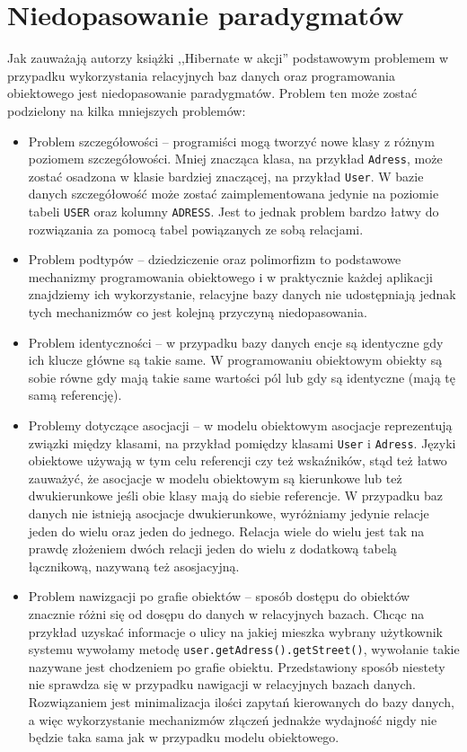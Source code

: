 \documentclass[12pt]{report}
\begin{document}
\section{Niedopasowanie paradygmatów}

Jak zauważają autorzy książki ,,Hibernate w akcji'' \cite{hibernate} podstawowym problemem w przypadku wykorzystania relacyjnych baz danych oraz programowania 
obiektowego jest niedopasowanie paradygmatów. Problem ten może zostać podzielony na kilka mniejszych problemów:

\begin{itemize}
\item Problem szczegółowości -- programiści mogą tworzyć nowe klasy z różnym poziomem szczegółowości. Mniej znacząca klasa, na przykład {\tt Adress}, może zostać
osadzona w klasie bardziej znaczącej, na przykład {\tt User}. W bazie danych szczegółowość może zostać zaimplementowana jedynie na po\-ziomie tabeli
{\tt USER} oraz kolumny {\tt ADRESS}. Jest to jednak problem bardzo łatwy do rozwiązania za pomocą tabel powiązanych ze sobą relacjami.
\item Problem podtypów -- dziedziczenie oraz polimorfizm to podstawowe mechanizmy programowania obiektowego i w praktycznie każdej aplikacji znajdziemy ich 
wykorzystanie, relacyjne bazy danych nie udostępniają jednak tych mechanizmów co jest kolejną przyczyną niedopasowania.
\item Problem identyczności -- w przypadku bazy danych encje są identyczne gdy ich klucze główne są takie same. W programowaniu obiektowym obiekty są sobie równe
gdy mają takie same wartości pól lub gdy są identyczne (mają tę samą referencję).
\item Problemy dotyczące asocjacji -- w modelu obiektowym asocjacje reprezentują związki między klasami, na przykład pomiędzy klasami {\tt User} i {\tt Adress}. Języki
obiektowe używają w tym celu referencji czy też wskaźników, stąd też łatwo zauważyć, że asocjacje w modelu obiektowym są kierunkowe lub też dwu\-kierunkowe jeśli
obie klasy mają do siebie referencje. W przypadku baz danych nie istnieją asocjacje dwukierunkowe, wyróżniamy jedynie relacje jeden do wielu oraz jeden do jednego.
Relacja wiele do wielu jest tak na prawdę złożeniem dwóch relacji jeden do wielu z dodatkową tabelą łącznikową, na\-zywaną też asosjacyjną.
\item Problem nawizgacji po grafie obiektów -- sposób dostępu do obiektów zna\-cznie różni się od dosępu do danych w relacyjnych bazach. Chcąc na przykład uzyskać
informacje o ulicy na jakiej mieszka wybrany użytkownik systemu wywołamy metodę {\tt user.getAdress().getStreet()}, wywołanie takie nazywane jest chodzeniem
po grafie obiektu. Przedstawiony sposób niestety nie sprawdza się w przypadku nawigacji w relacyjnych bazach danych. Rozwią\-zaniem jest minimalizacja ilości zapytań
kierowanych do bazy danych, a więc wykorzystanie mechanizmów złączeń jednakże wydajność nigdy nie będzie taka sama jak w przypadku modelu obiektowego.
\end{itemize}
\end{document}
